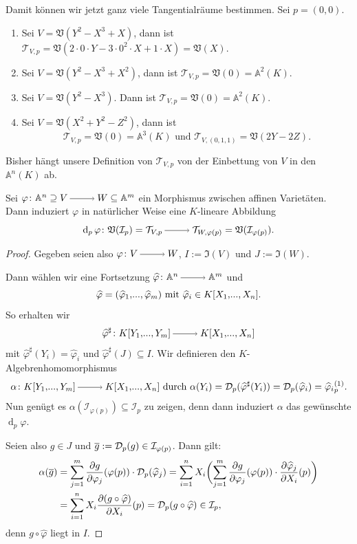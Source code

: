 \documentclass[a4paper,12pt,index=toc]{scrbook}
\theoremstyle{keinenummern} %
\def\A{\mathbb{A}}
\def\V{\mathfrak{V}}
\def\I{\mathfrak{I}}
\def\II{\mathcal{I}}
\newcommand{\DD}{\mathcal{D}} %
\def\T{\mathcal{T}}
\renewcommand{\dotsc}{\ensuremath{\!...}}
\newcommand{\dach}{\widehat}
\def\Bar#1{\ensuremath\overline{#1}}
\newcommand{\polyx}[1][n]{\ensuremath%
  [X_{1},\dotsc,X_{#1}]}
\begin{document}
\begin{bsp}\label{3.3.5}
Damit können wir jetzt ganz viele Tangentialräume bestimmen. Sei $p=(0,0)$.
\begin{enumerate}
\item Sei $V=\V(Y^{2}-X^{3}+X)$, dann ist $\T_{V,p}=\V(2\cdot 0\cdot Y - 3\cdot 0^{2}\cdot X + 1\cdot X)=\V(X)$.
\item Sei $V=\V(Y^{2}-X^{3}+X^{2})$, dann ist $\T_{V,p}=\V(0)=\A^{2}(K)$.
\item Sei $V=\V(Y^{2}-X^{3})$. Dann ist $\T_{V,p}=\V(0)=\A^{2}(K)$.
\item Sei $V=\V(X^{2}+Y^{2}-Z^{2})$, dann ist 
\[\T_{V,p}=\V(0)=\A^{3}(K)\text{ und }\T_{V,(0,1,1)}=\V(2Y-2Z).\]
\end{enumerate}\end{bsp}

\begin{w} Bisher hängt unsere Definition von $\T_{V,p}$ von der Einbettung von $V$ in den $\A^{n}(K)$ ab.\end{w}

\begin{bem}\label{3.3.6}
Sei $\varphi\colon\A^{n}\supseteq V\ra W\subseteq\A^{m}$ ein Morphismus zwischen affinen Varietäten. Dann induziert $\varphi$ in natürlicher Weise eine $K$-lineare Abbildung
\[\operatorname{d}_{p}\varphi\colon\V(\II_{p})=\T_{V,p}\ra\T_{W,\varphi(p)}=\V(\II_{\varphi(p)}).\]
\end{bem}

\begin{proof}
Gegeben seien also $\varphi\colon V\ra W$, $I:=\I(V)$ und $J:=\I(W)$.

Dann wählen wir eine Fortsetzung $\dach{\varphi}\colon\A^{n}\ra\A^{m}$ und 
\[\dach{\varphi}=(\dach{\varphi}_{1},\dotsc,\dach{\varphi}_{m})\text{ mit }\dach{\varphi}_{i}\in K\polyx.\] 
So erhalten wir
\[\dach{\varphi}^{\sharp}\colon K[Y_{1},\dotsc,Y_{m}]\ra K\polyx\]
mit $\dach{\varphi}^{\sharp}(Y_{i})=\dach{\varphi}_{i}$ und $\dach{\varphi}^{\sharp}(J)\subseteq I$. Wir definieren den $K$-Algebrenhomomorphismus
\[\alpha\colon K[Y_{1},\dotsc,Y_{m}]\ra K\polyx\text{ durch }\alpha(Y_{i})=\DD_{p}(\dach{\varphi}^{\sharp}(Y_{i}))=\DD_{p}(\dach{\varphi}_{i})=\dach{\varphi}_{i}\mbox{}^{(1)}_{p}.\]
Nun genügt es $\alpha(\II_{\varphi(p)})\subseteq\II_{p}$ zu zeigen, denn dann induziert $\alpha$ das gewünschte $\operatorname{d}_{p}\varphi$.

Seien also $g\in J$ und $\Bar{g}:=\DD_{p}(g)\in\II_{\varphi(p)}$. Dann gilt:
\begin{align*}
\alpha(\Bar{g})&=\sum_{j=1}^{m}\frac{\partial g}{\partial \varphi_{j}}(\varphi(p))\cdot \DD_{p}(\dach{\varphi}_{j})=\sum_{i=1}^{n}X_{i}\biggl(\sum_{j=1}^{m}\frac{\partial g}{\partial \varphi_{j}}(\varphi(p))\cdot\frac{\partial\dach{\varphi}_{j}}{\partial X_{i}}(p)\biggr)\\
&=\sum_{i=1}^{n}X_{i}\frac{\partial (g\circ \dach{\varphi})}{\partial X_{i}}(p)=\DD_{p}(g\circ\dach{\varphi})\in\II_{p},
\end{align*}
denn $g\circ\dach{\varphi}$ liegt in $I$.
\end{proof}
\end{document}
